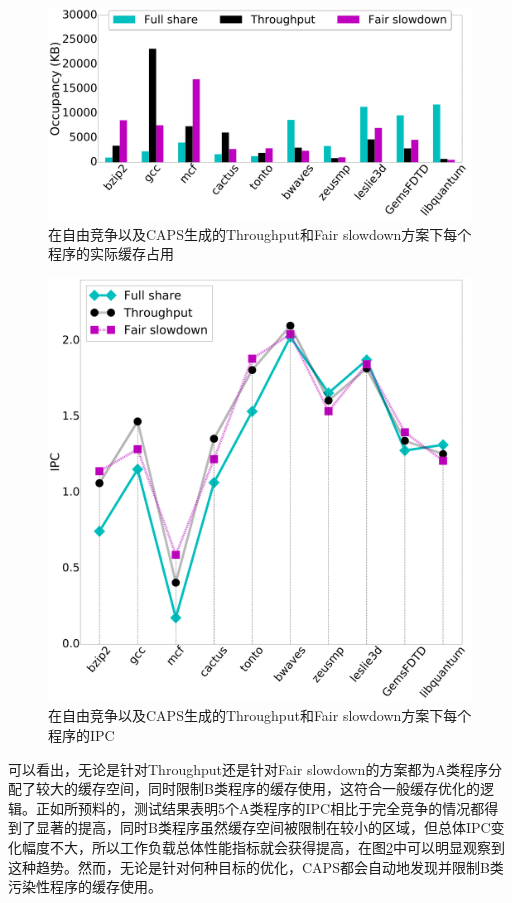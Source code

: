 \begin{figure}[htbp]
\centering
\includegraphics[width=0.9\linewidth]{figures/occ.pdf}
\caption{在自由竞争以及CAPS生成的Throughput和Fair slowdown方案下每个程序的实际缓存占用}
\label{fig:case_occu}
\end{figure} 

\begin{figure}[htbp]
\centering
\includegraphics[width=0.6\columnwidth]{figures/case_ipc.pdf}
\caption{在自由竞争以及CAPS生成的Throughput和Fair slowdown方案下每个程序的IPC}
\label{fig:case_ipc}
\end{figure} 

可以看出，无论是针对Throughput还是针对Fair slowdown的方案都为A类程序分配了较大的缓存空间，同时限制B类程序的缓存使用，这符合一般缓存优化的逻辑。正如所预料的，测试结果表明5个A类程序的IPC相比于完全竞争的情况都得到了显著的提高，同时B类程序虽然缓存空间被限制在较小的区域，但总体IPC变化幅度不大，所以工作负载总体性能指标就会获得提高，在图\ref{fig:case_ipc}中可以明显观察到这种趋势。然而，无论是针对何种目标的优化，CAPS都会自动地发现并限制B类污染性程序的缓存使用。

